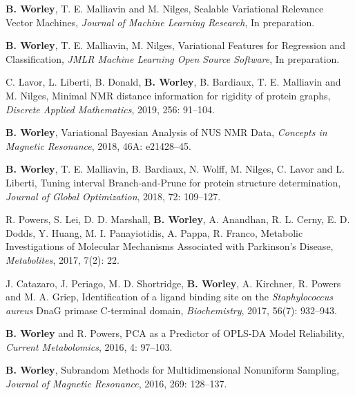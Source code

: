 \documentclass[letterpaper]{article}
\renewenvironment{itemize}{
  \begin{list}{}{
    \setlength{\leftmargin}{1.5em}
  }
}{
  \end{list}
}
\begin{document}
\begin{itemize}
 \item \textbf{B. Worley}, T. E. Malliavin and M. Nilges,
  Scalable Variational Relevance Vector Machines,
  \emph{Journal of Machine Learning Research},
  In preparation.

 \item \textbf{B. Worley}, T. E. Malliavin, M. Nilges,
  Variational Features for Regression and Classification,
  \emph{JMLR Machine Learning Open Source Software},
  In preparation.

 \item C. Lavor, L. Liberti, B. Donald, \textbf{B. Worley},
  B. Bardiaux, T. E. Malliavin and M. Nilges, Minimal NMR distance
  information for rigidity of protein graphs,
  \emph{Discrete Applied Mathematics},
  2019, 256: 91--104.

 \item \textbf{B. Worley},
  Variational Bayesian Analysis of NUS NMR Data,
  \emph{Concepts in Magnetic Resonance},
  2018, 46A: e21428--45.

 \item \textbf{B. Worley}, T. E. Malliavin, B. Bardiaux, N. Wolff,
  M. Nilges, C. Lavor and L. Liberti, Tuning interval Branch-and-Prune
  for protein structure determination,
  \emph{Journal of Global Optimization},
  2018, 72: 109--127.

 \item R. Powers, S. Lei, D. D. Marshall, \textbf{B. Worley}, A. Anandhan,
  R. L. Cerny, E. D. Dodds, Y. Huang, M. I. Panayiotidis, A. Pappa,
  R. Franco, Metabolic Investigations of Molecular Mechanisms
  Associated with Parkinson's Disease,
  \emph{Metabolites},
  2017, 7(2): 22.

 \item J. Catazaro, J. Periago, M. D. Shortridge, \textbf{B. Worley},
  A. Kirchner, R. Powers and M. A. Griep,
  Identification of a ligand binding site on the
  \emph{Staphylococcus aureus} DnaG primase C-terminal domain,
  \emph{Biochemistry}, 2017, 56(7): 932--943.

 \item \textbf{B. Worley} and R. Powers,
  PCA as a Predictor of OPLS-DA Model Reliability,
  \emph{Current Metabolomics},
  2016, 4: 97--103.

 \item \textbf{B. Worley},
  Subrandom Methods for Multidimensional Nonuniform Sampling,
  \emph{Journal of Magnetic Resonance},
  2016, 269: 128--137.


\end{itemize}
\end{document}
